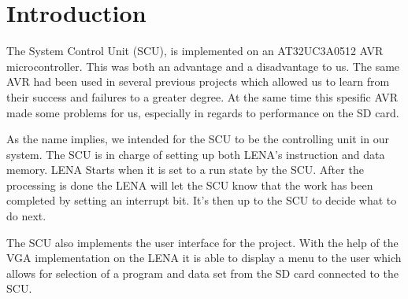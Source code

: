 \section{Introduction}

The System Control Unit (SCU), is implemented on an AT32UC3A0512 AVR microcontroller. This was both an advantage and a disadvantage to us. The same AVR had been used in several previous projects which allowed us to learn from their success and failures to a greater degree. At the same time this spesific AVR made some problems for us, especially in regards to performance on the SD card. 

\begin{comment}
Denna prosess tingen hører ikke hjemme under 'introduction'

When we first started working on the SCU we focused mostly on the hardware mappings as this was needed for the PCB to be delivered. We made sure to make it as similar as possible to the EVK1100 test card which we had avaliable. This made it possible for us to begin writing and testing some of our code before the PCB arrived. Having completed this we were able to start thinking about the code and to define what we figured we would need in terms of functions and headers for our application. Granted this was not set in stone as much of the design was yet to be determined, but it gave us a starting point to which we were able to work and improve upon.
\end{comment}

As the name implies, we intended for the SCU to be the controlling unit in our system. The SCU is in charge of setting up both LENA's instruction and data memory. LENA Starts when it is set to a run state by the SCU. After the processing is done the LENA will let the SCU know that the work has been completed by setting an interrupt bit. It's then up to the SCU to decide what to do next. 

The SCU also implements the user interface for the project. With the help of the VGA implementation on the LENA it is able to display a menu to the user which allows for selection of a program and data set from the SD card connected to the SCU.
